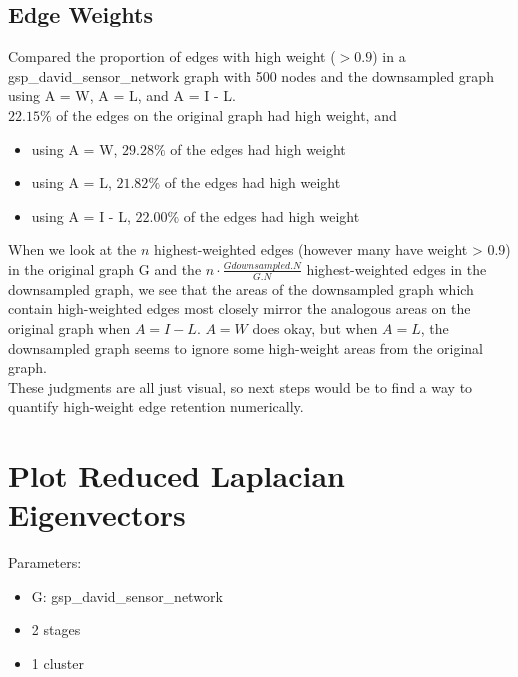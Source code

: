 \documentclass[a4paper]{article}
\begin{document}
\subsection{Edge Weights}
Compared the proportion of edges with high weight ($> 0.9$) in a gsp\_david\_sensor\_network graph with 500 nodes and the downsampled graph using A = W, A = L, and A = I - L. \\
$22.15\%$  of the edges on the original graph had high weight, and
\begin{itemize}
\item using A = W, $29.28\%$ of the edges had high weight
\item using A = L, $21.82\%$ of the edges had high weight
\item using A = I - L, $22.00\%$ of the edges had high weight
\end{itemize}
When we look at the $n$ highest-weighted edges (however many have weight > 0.9) in the original graph G and the $n \cdot \frac{G downsampled.N}{G.N}$ highest-weighted edges in the downsampled graph, we see that the areas of the downsampled graph which contain high-weighted edges most closely mirror the analogous areas on the original graph when $A = I - L$. $A = W$ does okay, but when $A = L$, the downsampled graph seems to ignore some high-weight areas from the original graph. \\
These judgments are all just visual, so next steps would be to find a way to quantify high-weight edge retention numerically.

\section{Plot Reduced Laplacian Eigenvectors}

Parameters:
\begin{itemize}
\item G: gsp\_david\_sensor\_network
\item 2 stages
\item 1 cluster
\end{itemize}
\end{document}
